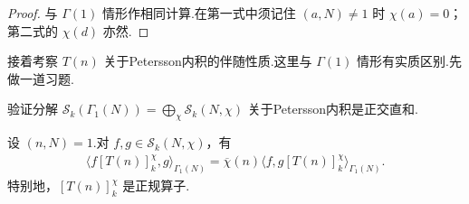 \begin{proof}

与 $\Gamma(1)$ 情形作相同计算.在第一式中须记住 $(a,N)\ne1$ 时 $\chi(a)=0$；第二式的 $\chi(d)$ 亦然.

\end{proof}

接着考察 $T(n)$ 关于Petersson内积的伴随性质.这里与 $\Gamma(1)$ 情形有实质区别.先做一道习题.

\begin{exercise*}

验证分解 $\mathcal S_k(\Gamma_1(N))=\bigoplus_\chi\mathcal S_k(N,\chi)$ 关于Petersson内积是正交直和.

\end{exercise*}

\begin{proposition*}

设 $(n,N)=1$.对 $f,g\in\mathcal S_k(N,\chi)$，有
\begin{align*}
\langle f[T(n)]_k^\chi,g\rangle_{\Gamma_1(N)}=\overline\chi(n)\langle f,g[T(n)]_k^\chi\rangle_{\Gamma_1(N)}.
\end{align*}
特别地，$[T(n)]_k^\chi$ 是正规算子.

\end{proposition*}

